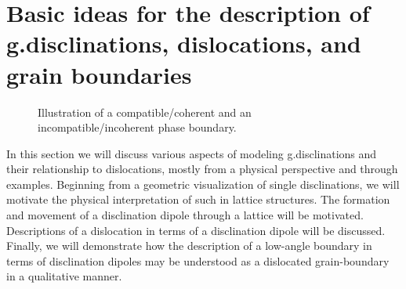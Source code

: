 \documentclass[11pt,letterpaper]{article}
\begin{document}
\section{Basic ideas for the description of g.disclinations, dislocations, and grain boundaries} \label{sec:physical_exp}

\begin {figure}
\centering
{}\qquad
{}
\caption{Illustration of a compatible/coherent and an incompatible/incoherent phase boundary.}\label{fig:compatible}
\end {figure}

In this section we will discuss various aspects of modeling g.disclinations and their relationship to dislocations, mostly from a physical perspective and through examples. Beginning from a geometric visualization of single disclinations, we will motivate the physical interpretation of such in lattice structures. The formation and movement of a disclination dipole through a lattice will be motivated.  Descriptions of a dislocation in terms of a disclination dipole will be discussed. Finally, we will demonstrate how the description of a low-angle boundary in terms of disclination dipoles may be understood as a dislocated grain-boundary in a qualitative manner.
\end{document}
